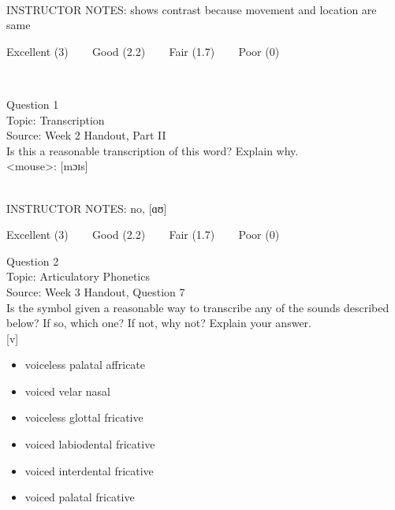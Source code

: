\documentclass[12pt]{article}
\begin{document}
~\\
INSTRUCTOR NOTES: shows contrast because movement and location are same


\vfill
Excellent (3) ~~~ Good (2.2) ~~~ Fair (1.7) ~~~ Poor (0)
\newpage

\begin{center}
\textbf{{\color{red}{\HUGE END OF EXAM}}}\\

\end{center}
\newpage

\begin{center}
\textbf{{\color{blue}{\HUGE START OF EXAM\\}}}

\textbf{{\color{blue}{\HUGE Student ID: 60523\\}}}

\textbf{{\color{blue}{\HUGE \\}}}

\end{center}
\newpage

{\large Question 1}\\

Topic: Transcription\\
Source: Week 2 Handout, Part II\\

Is this a reasonable transcription of this word? Explain why.\\

<mouse>: {[mɔɪs]}


~\\
INSTRUCTOR NOTES: no, [ɑʊ]


\vfill
Excellent (3) ~~~ Good (2.2) ~~~ Fair (1.7) ~~~ Poor (0)
\newpage

{\large Question 2}\\

Topic: Articulatory Phonetics\\
Source: Week 3 Handout, Question 7\\

Is the symbol given a reasonable way to transcribe any of the sounds described below? If so, which one? If not, why not? Explain your answer.\\

{[v]}

\begin{itemize} \item voiceless palatal affricate \item voiced velar nasal \item voiceless glottal fricative \item voiced labiodental fricative \item voiced interdental fricative \item voiced palatal fricative \end{itemize}
\end{document}
